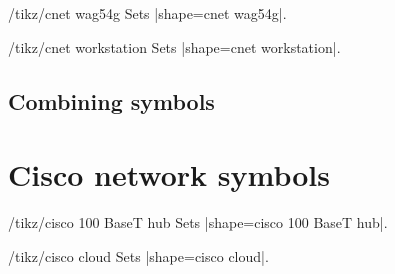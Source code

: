 \documentclass[a4paper]{ltxdoc}
\begin{document}
\begin{stylekey}{/tikz/cnet wag54g}
Sets |shape={cnet wag54g}|.
\begin{codeexample}[preamble={\usetikzlibrary{shapes.cnet.wag54g}}]
\end{codeexample}
\end{stylekey}

\begin{stylekey}{/tikz/cnet workstation}
Sets |shape={cnet workstation}|.
\begin{codeexample}[preamble={\usetikzlibrary{shapes.cnet.workstation}}]
\end{codeexample}
\end{stylekey}

\subsection{Combining symbols}
\label{sec: combining-symbols}

\begin{codeexample}[preamble={\usetikzlibrary{shapes.cnet.car}}]
\end{codeexample}

\begin{codeexample}[preamble={\usetikzlibrary{shapes.cnet.smartphone}}]
\end{codeexample}


\section{Cisco network symbols}
\label{sec:cisco-network-symbols}

\begin{stylekey}{/tikz/cisco 100 BaseT hub}
Sets |shape={cisco 100 BaseT hub}|.
\begin{codeexample}[preamble={\usetikzlibrary{shapes.cisco.100basethub}}]
\end{codeexample}
\end{stylekey}

\begin{stylekey}{/tikz/cisco cloud}
Sets |shape={cisco cloud}|.
\begin{codeexample}[preamble={\usetikzlibrary{shapes.cisco.cloud}}]
\end{codeexample}
\end{stylekey}
\end{document}
